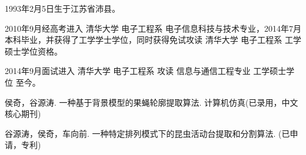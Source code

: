 \begin{resume}


1993年2月5日生于江苏省沛县。

2010年9月经高考进入 清华大学 电子工程系 电子信息科技与技术专业，2014年7月本科毕业，并获得了工学学士学位，同时获得免试攻读 清华大学 电子工程系 工学硕士学位资格。

2014年9月面试进入 清华大学 电子工程系 攻读 信息与通信工程专业 工学硕士学位 至今。


\begin{publications}
\item 侯奇，谷源涛. 一种基于背景模型的果蝇轮廓提取算法. 计算机仿真(已录用，中文核心期刊)
\item 谷源涛，侯奇，车向前. 一种特定排列模式下的昆虫活动台提取和分割算法. (已申请，专利)
\end{publications}

\end{resume}
